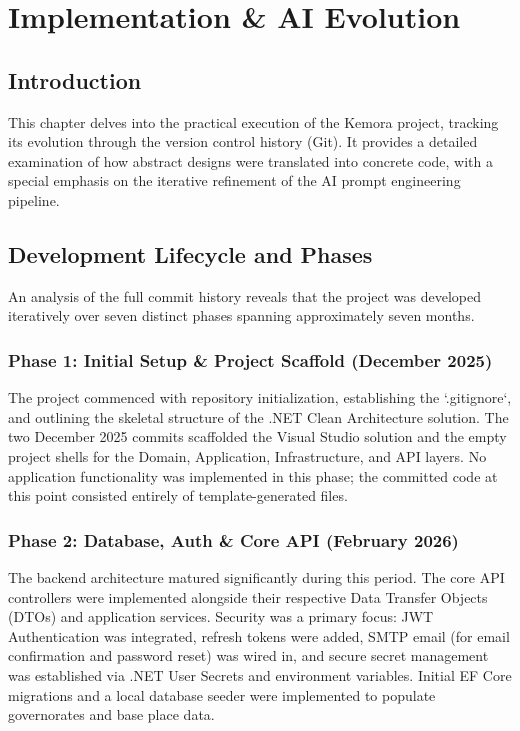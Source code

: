 \chapter{Implementation \& AI Evolution}

\section{Introduction}
This chapter delves into the practical execution of the Kemora project, tracking its evolution through the version control history (Git). It provides a detailed examination of how abstract designs were translated into concrete code, with a special emphasis on the iterative refinement of the AI prompt engineering pipeline.

\section{Development Lifecycle and Phases}
An analysis of the full commit history reveals that the project was developed iteratively over seven distinct phases spanning approximately seven months.

\subsection{Phase 1: Initial Setup \& Project Scaffold (December 2025)}
The project commenced with repository initialization, establishing the `.gitignore`, and outlining the skeletal structure of the .NET Clean Architecture solution. The two December 2025 commits scaffolded the Visual Studio solution and the empty project shells for the Domain, Application, Infrastructure, and API layers. No application functionality was implemented in this phase; the committed code at this point consisted entirely of template-generated files.

\subsection{Phase 2: Database, Auth \& Core API (February 2026)}
The backend architecture matured significantly during this period. The core API controllers were implemented alongside their respective Data Transfer Objects (DTOs) and application services. Security was a primary focus: JWT Authentication was integrated, refresh tokens were added, SMTP email (for email confirmation and password reset) was wired in, and secure secret management was established via .NET User Secrets and environment variables. Initial EF Core migrations and a local database seeder were implemented to populate governorates and base place data.

